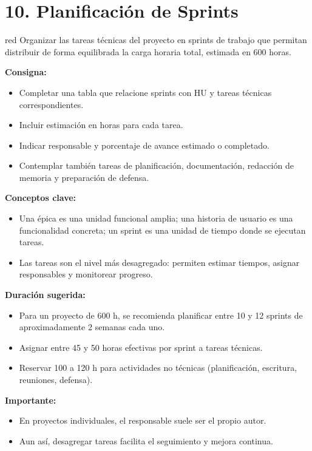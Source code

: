\section{10. Planificación de Sprints}
\label{sec:sprints}


\begin{consigna}{red}
Organizar las tareas técnicas del proyecto en sprints de trabajo que permitan distribuir de forma equilibrada la carga horaria total, estimada en 600 horas.

\textbf{Consigna:}
\begin{itemize}
  \item Completar una tabla que relacione sprints con HU y tareas técnicas correspondientes.
  \item Incluir estimación en horas para cada tarea.
  \item Indicar responsable y porcentaje de avance estimado o completado.
  \item Contemplar también tareas de planificación, documentación, redacción de memoria y preparación de defensa.
\end{itemize}

\textbf{Conceptos clave:}
\begin{itemize}
  \item Una \'{e}pica es una unidad funcional amplia; una historia de usuario es una funcionalidad concreta; un sprint es una unidad de tiempo donde se ejecutan tareas.
  \item Las tareas son el nivel más desagregado: permiten estimar tiempos, asignar responsables y monitorear progreso.
\end{itemize}

\textbf{Duración sugerida:}
\begin{itemize}
  \item Para un proyecto de 600 h, se recomienda planificar entre 10 y 12 sprints de aproximadamente 2 semanas cada uno.
  \item Asignar entre 45 y 50 horas efectivas por sprint a tareas técnicas.
  \item Reservar 100 a 120 h para actividades no técnicas (planificación, escritura, reuniones, defensa).
\end{itemize}

\textbf{Importante:}
\begin{itemize}
  \item En proyectos individuales, el responsable suele ser el propio autor.
  \item Aun así, desagregar tareas facilita el seguimiento y mejora continua.
\end{itemize}


\end{consigna}

